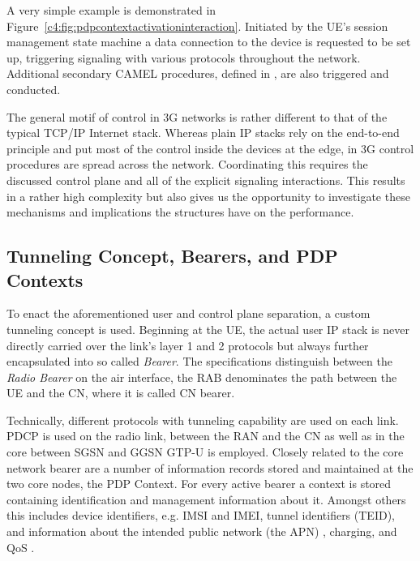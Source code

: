 A very simple example is demonstrated in Figure~\ref{c4:fig:pdpcontextactivationinteraction}. Initiated by the \gls{UE}'s session management state machine a data connection to the device is requested to be set up, triggering signaling with various protocols throughout the network. Additional secondary \gls{CAMEL} procedures, defined in \cite{3gpp.23.078}, are also triggered and conducted.

The general motif of control in \gls{3G} networks is rather different to that of the typical \gls{TCP}/\gls{IP} Internet stack. Whereas plain \gls{IP} stacks rely on the end-to-end principle and put most of the control inside the devices at the edge, in \gls{3G} control procedures are spread across the network. Coordinating this requires the discussed control plane and all of the explicit signaling interactions. This results in a rather high complexity but also gives us the opportunity to investigate these mechanisms and implications the structures have on the performance.


\subsection{Tunneling Concept, Bearers, and \texorpdfstring{\acrshort{PDP}}{PDP} Contexts}

To enact the aforementioned user and control plane separation, a custom tunneling concept is used. Beginning at the \gls{UE}, the actual user \gls{IP} stack is never directly carried over the link's layer 1 and 2 protocols but always further encapsulated into so called \textit{Bearer}. The specifications distinguish between the \textit{Radio Bearer} on the air interface, the \gls{RAB} denominates the path between the \gls{UE} and the \gls{CN}, where it is called \gls{CN} bearer.

Technically, different protocols with tunneling capability are used on each link. \gls{PDCP} is used on the radio link, between the \gls{RAN} and the \gls{CN} as well as in the core between \gls{SGSN} and \gls{GGSN} \gls{GTP-U} is employed. Closely related to the core network bearer are a number of information records stored and maintained at the two core nodes, the \gls{PDP} Context. For every active bearer a context is stored containing identification and management information about it. Amongst others this includes device identifiers, e.g. \gls{IMSI} and \gls{IMEI}, tunnel identifiers (\gls{TEID}), and information about the intended public network (the \gls{APN}) , charging, and \gls{QoS} \cite[Section~13]{3gpp.23.060}.

